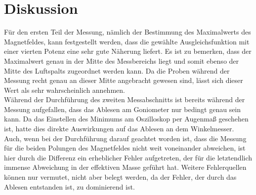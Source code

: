 \section{Diskussion}
Für den ersten Teil der Messung, nämlich der Bestimmung des Maximalwerts des Magnetfeldes, kann festgestellt werden, dass die gewählte Ausgleichsfunktion mit einer vierten Potenz eine sehr gute Näherung liefert. Es ist zu bemerken, dass der Maximalwert genau in der Mitte des Messbereichs liegt und somit ebenso der Mitte des Luftspalts zugeordnet werden kann.
Da die Proben während der Messung recht genau an dieser Mitte angebracht gewesen sind, lässt sich dieser Wert als sehr wahrscheinlich annehmen.\\
Während der Durchführung des zweiten Messabschnitts ist bereits während der Messung aufgefallen, dass das Ablesen am Goniometer nur bedingt genau sein kann. Da das Einstellen des Minimums am Oszilloskop per Augenmaß geschehen ist, hatte dies direkte Auswirkungen auf das Ablesen an dem Winkelmesser. Auch, wenn bei der Durchführung darauf geachtet worden ist, dass die Messung für die beiden Polungen des Magnetfeldes nicht weit voneinander abweichen, ist hier durch die Differenz ein erheblicher Fehler aufgetreten, der für die letztendlich immense Abweichung in der effektiven Masse geführt hat. Weitere Fehlerquellen können nur vermutet, nicht aber belegt werden, da der Fehler, der durch das Ablesen entstanden ist, zu dominierend ist.

